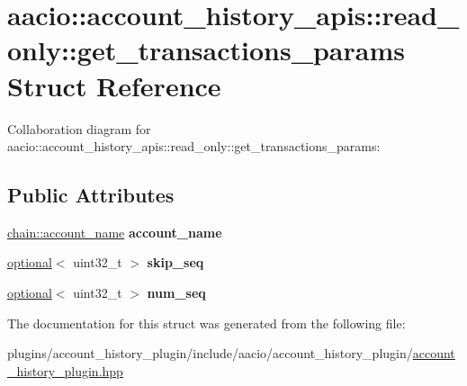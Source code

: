 \hypertarget{structaacio_1_1account__history__apis_1_1read__only_1_1get__transactions__params}{}\section{aacio\+:\+:account\+\_\+history\+\_\+apis\+:\+:read\+\_\+only\+:\+:get\+\_\+transactions\+\_\+params Struct Reference}
\label{structaacio_1_1account__history__apis_1_1read__only_1_1get__transactions__params}


Collaboration diagram for aacio\+:\+:account\+\_\+history\+\_\+apis\+:\+:read\+\_\+only\+:\+:get\+\_\+transactions\+\_\+params\+:
\subsection*{Public Attributes}
\begin{DoxyCompactItemize}
\item 
\mbox{\label{structaacio_1_1account__history__apis_1_1read__only_1_1get__transactions__params_af397b5f23e7fadc5379b666859cd1cfc}} 
\mbox{\hyperlink{structaacio_1_1chain_1_1name}{chain\+::account\+\_\+name}} {\bfseries account\+\_\+name}
\item 
\mbox{\label{structaacio_1_1account__history__apis_1_1read__only_1_1get__transactions__params_a14bdcfd7f2b7eb8bdd8e78d92e17356e}} 
\mbox{\hyperlink{classaacio_1_1optional}{optional}}$<$ uint32\+\_\+t $>$ {\bfseries skip\+\_\+seq}
\item 
\mbox{\label{structaacio_1_1account__history__apis_1_1read__only_1_1get__transactions__params_a662eeb9e5914a5586b871d07b05eac7d}} 
\mbox{\hyperlink{classaacio_1_1optional}{optional}}$<$ uint32\+\_\+t $>$ {\bfseries num\+\_\+seq}
\end{DoxyCompactItemize}


The documentation for this struct was generated from the following file\+:\begin{DoxyCompactItemize}
\item 
plugins/account\+\_\+history\+\_\+plugin/include/aacio/account\+\_\+history\+\_\+plugin/\mbox{\hyperlink{account__history__plugin_8hpp}{account\+\_\+history\+\_\+plugin.\+hpp}}\end{DoxyCompactItemize}
